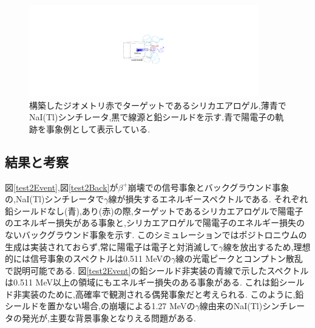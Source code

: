 \begin{figure}[!tbp]
	\centering
		\includegraphics[width=10cm]{img/test2_geometry.pdf}
	\caption[構築したジオメトリ]{構築したジオメトリ\newline 赤でターゲットであるシリカエアロゲル,薄青でNaI(Tl)シンチレータ,黒で線源と鉛シールドを示す.青で陽電子の軌跡を事象例として表示している.}
	\label{test2_geometry}
\end{figure}

\subsection{結果と考察}

図\ref{test2Event},図\ref{test2Back}が$\beta^+$崩壊での信号事象とバックグラウンド事象の,NaI(Tl)シンチレータで$\gamma$線が損失するエネルギースペクトルである.
それぞれ鉛シールドなし(青),あり(赤)の際,ターゲットであるシリカエアロゲルで陽電子のエネルギー損失がある事象と,シリカエアロゲルで陽電子のエネルギー損失のないバックグラウンド事象を示す.
このシミュレーションではポジトロニウムの生成は実装されておらず,常に陽電子は電子と対消滅して$\gamma$線を放出するため,理想的には信号事象のスペクトルは0.511 MeVの$\gamma$線の光電ピークとコンプトン散乱で説明可能である.
図\ref{test2Event}の鉛シールド非実装の青線で示したスペクトルは0.511 MeV以上の領域にもエネルギー損失のある事象がある.
これは鉛シールド非実装のために,高確率で観測される偶発事象だと考えられる.
このように,鉛シールドを置かない場合,の崩壊による1.27 MeVの$\gamma$線由来のNaI(Tl)シンチレータの発光が,主要な背景事象となりえる問題がある.

